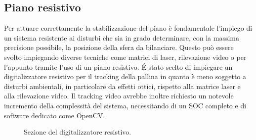 \documentclass[12pt,twoside,openright]{article}
\begin{document}
\subsection{Piano resistivo}\label{pianoresistivo}
Per attuare correttamente la stabilizzazione del piano è fondamentale l'impiego di un sistema resistente ai disturbi che sia in grado determinare, con la massima precisione possibile, la posizione della sfera da bilanciare. Questo può essere svolto impiegando diverse tecniche come matrici di laser, rilevazione video o per l'appunto tramite l'uso di un piano resistivo.
É stato scelto di impiegare un digitalizzatore resistivo per il tracking della pallina in quanto è meno soggetto a disturbi ambientali, in particolare da effetti ottici, rispetto alla matrice laser e alla rilevazione video.
Il tracking video avrebbe inoltre richiesto un notevole incremento della complessità del sistema, necessitando di un SOC completo e di software dedicato come OpenCV.
\begin{figure}[h!]
\centering
{}
\caption{Sezione del digitalizzatore resistivo.} \label{fig:sezione}
\end{figure}
\end{document}
